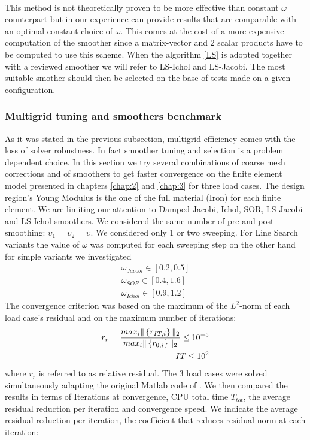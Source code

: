  \\
 This method is not theoretically proven to be more effective than constant $\omega$ counterpart but in our experience can provide results that are comparable with an optimal constant choice of $\omega$. This comes at the cost of a more expensive computation of the smoother since a matrix-vector and 2 scalar products have to be computed to use this scheme. When the algorithm \ref{LS} is adopted together with a reviewed smoother we will refer to LS-Ichol and LS-Jacobi. The most suitable smother should then be selected on the base of tests made on a given configuration.  
 \subsubsection{Multigrid tuning and smoothers benchmark}
 As it was stated in the previous subsection, multigrid efficiency comes with the loss of solver robustness. In fact smoother tuning and selection is a problem dependent choice.
 In this section we try several combinations of coarse mesh corrections and of smoothers to get faster convergence on the finite element model presented in chapters \ref{chap:2} and \ref{chap:3} for three load cases. The design region's Young Modulus is the one of the full material (Iron) for each finite element.
 We are limiting our attention to Damped Jacobi, Ichol, SOR, LS-Jacobi and LS Ichol smoothers. We considered the same number of pre and post smoothing: $\upsilon_1=\upsilon_2=\upsilon$. We considered only 1 or two sweeping. For Line Search variants the value of $\omega$ was computed for each sweeping step on the other hand for simple variants we investigated
 \begin{eqnarray}
\omega_{Jacobi}\in[0.2,0.5]\\
\omega_{SOR} \in [0.4,1.6]\\
\omega_{Ichol} \in [0.9,1.2]
 \end{eqnarray}
 The convergence criterion was based on the maximum of the $L^2$-norm of each load case's residual and on the maximum number of iterations:
 \begin{eqnarray}
 r_r=\frac{max_i\|\left\lbrace{r_{IT,i}}\right \rbrace\|_2}{max_i\|\left\lbrace{r_{0,i}}\right \rbrace\|_2}\leq 10^{-5}\\
  IT\leq 10^{2}
 \end{eqnarray}
 where $ r_r$ is referred to as relative residual.
  The 3 load cases were solved simultaneously adapting the original Matlab code of \cite{amir2014multigrid}.
 We then compared the results in terms of Iterations at convergence, CPU total time $T_{tot}$, the average residual reduction per iteration and convergence speed. We indicate the average residual reduction per iteration, the coefficient that reduces residual norm at each iteration:
